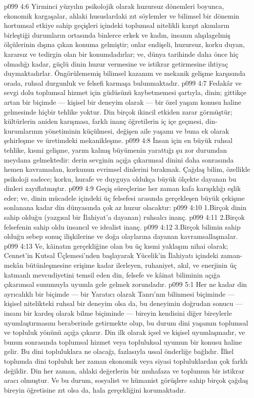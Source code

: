 \vs p099 4:6 Yirminci yüzyılın psikolojik olarak huzursuz dönemleri boyunca, ekonomik kargaşalar, ahlaki hususlardaki zıt söylemler ve bilimsel bir dönemin hortumsal etkiye sahip geçişleri içindeki toplumsal nitelikli karşıt akımların birleştiği durumların ortasında binlerce erkek ve kadın, insanın alışılagelmiş ölçülerinin dışına çıkan konuma gelmiştir; onlar endişeli, huzursuz, korku duyan, kararsız ve tedirgin olan bir konumdadırlar; ve, dünya tarihinde daha önce hiç olmadığı kadar, güçlü dinin huzur vermesine ve istikrar getirmesine ihtiyaç duymaktadırlar. Öngörülememiş bilimsel kazanım ve mekanik gelişme karşısında orada, ruhsal durgunluk ve felsefi karmaşa bulunmaktadır.
\vs p099 4:7 Fedakâr ve sevgi dolu toplumsal hizmet için güdüsünü kaybetmemesi şartıyla, dinin; gittikçe artan bir biçimde --- kişisel bir deneyim olarak --- bir özel yaşam konusu haline gelmesinde hiçbir tehlike yoktur. Din birçok ikincil etkiden zarar görmüştür; kültürlerin aniden karışması, farklı inanç öğretilerin iç içe geçmesi, din\hyp{}kurumlarının yönetiminin küçülmesi, değişen aile yaşamı ve buna ek olarak şehirleşme ve üretimdeki mekanikleşme.
\vs p099 4:8 İnsan için en büyük ruhsal tehlike, kısmi gelişme, yarım kalmış büyümenin yarattığı şu zor durumdan meydana gelmektedir: derin sevginin açığa çıkarımsal dinini daha sonrasında hemen kavramadan, korkunun evrimsel dinlerini bırakmak. Çağdaş bilim, özellikle psikoloji sadece; korku, hurafe ve duyguya oldukça büyük ölçekte dayanan bu dinleri zayıflatmıştır.
\vs p099 4:9 Geçiş süreçlerine her zaman kafa karışıklığı eşlik eder; ve, dinin mücadele içindeki üç felsefesi arasında gerçekleşen büyük çekişme sonlanana kadar din dünyasında çok az huzur olacaktır:
\vs p099 4:10 1.\bibnobreakspace Birçok dinin sahip olduğu (yazgısal bir İlahiyat'a dayanan) ruhsalcı inanç.
\vs p099 4:11 2.\bibnobreakspace Birçok felsefenin sahip oldu insancıl ve idealist inanç.
\vs p099 4:12 3.\bibnobreakspace Birçok bilimin sahip olduğu sebep sonuç ilişkilerine ve doğa olaylarına dayanan kavramsallaşmalar.
\vs p099 4:13 Ve, kâinatın gerçekliğine olan bu üç kısmi yaklaşım nihai olarak; Cennet’in Kutsal Üçlemesi’nden başlayarak Yücelik’in İlahiyatı içindeki zaman\hyp{}mekân bütünleşmesine erişime kadar ilerleyen, ruhaniyet, akıl, ve enerjinin üç katmanlı mevcudiyetini temsil eden din, felsefe ve kâinat biliminin açığa çıkarımsal sunumuyla uyumla gele gelmek zorundadır.
\vs p099 5:1 Her ne kadar din ayrıcalıklı bir biçimde --- bir Yaratıcı olarak Tanrı’nın bilinmesi biçiminde --- kişisel nitelikteki ruhsal bir deneyim olsa da, bu deneyimin doğrudan sonucu --- insanı bir kardeş olarak bilme biçiminde --- bireyin kendisini diğer bireylerle uyumlaştırmasını beraberinde getirmekte olup, bu durum dini yaşamın toplumsal ve topluluk yönünü açığa çıkarır. Din ilk olarak içsel ve kişisel uyumlaşmadır, ve bunun sonrasında toplumsal hizmet veya topluluksal uyumun bir konusu haline gelir. Bu dini topluluklara ne olacağı, fazlasıyla ussal önderliğe bağlıdır. İlkel toplumda dini topluluk her zaman ekonomik veya siyasi topluluklardan çok farklı değildir. Din her zaman, ahlaki değerlerin bir muhafaza ve toplumun bir istikrar aracı olmuştur. Ve bu durum, sosyalist ve hümanist görüşlere sahip birçok çağdaş bireyin öğretisine zıt olsa da, hala gerçekliğini korumaktadır.
